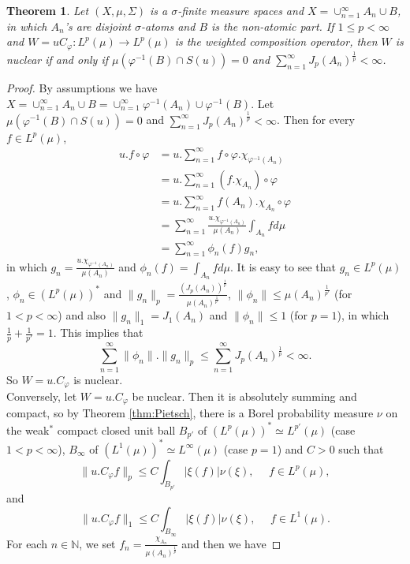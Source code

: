 \documentclass{amsart}
\newtheorem{thm}{Theorem}[section]
\theoremstyle{definition}\newtheorem{defn}[thm]{Definition}
\theoremstyle{remark}
\numberwithin{equation}{section}
\begin{document}
\begin{thm}\label{n.pp}
Let $(X, \mu, \Sigma)$ is a $\sigma$-finite measure spaces and $X=\cup^{\infty}_{n=1}A_n\cup B$, in which $A_n$'s are disjoint $\sigma$-atoms and $B$ is the non-atomic part. If $1\leq p<\infty$  and $W=uC_{\varphi}:L^p(\mu)\rightarrow L^p(\mu)$ is the weighted composition operator, then $W$ is nuclear if and only if $\mu(\varphi^{-1}(B)\cap S(u))=0$ and $\sum^{\infty}_{n=1}J_p(A_n)^{\frac{1}{p}}<\infty$.
\end{thm}
\begin{proof}
By assumptions we have $X=\cup^{\infty}_{n=1}A_n\cup B=\cup^{\infty}_{n=1}\varphi^{-1}(A_n)\cup \varphi^{-1}(B)$. Let $\mu(\varphi^{-1}(B)\cap S(u))=0$ and $\sum^{\infty}_{n=1}J_p(A_n)^{\frac{1}{p}}<\infty$. Then for every $f\in L^p(\mu)$,
\begin{align*}
u.f\circ \varphi&=u.\sum^{\infty}_{n=1}f\circ\varphi.\chi_{\varphi^{-1}(A_n)}\\
&=u.\sum^{\infty}_{n=1}(f.\chi_{A_n})\circ\varphi\\
&=u.\sum^{\infty}_{n=1}f(A_n).\chi_{A_n}\circ\varphi\\
&=\sum^{\infty}_{n=1}\frac{u.\chi_{\varphi^{-1}(A_n)}}{\mu(A_n)}\int_{A_n}fd\mu\\
&=\sum^{\infty}_{n=1}\phi_n(f)g_n,
\end{align*}
in which $g_n=\frac{u.\chi_{\varphi^{-1}(A_n)}}{\mu(A_n)}$ and $\phi_n(f)=\int_{A_n}fd\mu$. It is easy to see that $g_n\in L^p(\mu)$, $\phi_n\in (L^p(\mu))^*$ and $\|g_n\|_p=\frac{(J_p(A_n))^{\frac{1}{p}}}{\mu(A_n)^{\frac{1}{p'}}}$, $\|\phi_n\|\leq\mu(A_n)^{\frac{1}{p'}}$ (for $1<p<\infty$) and also $\|g_n\|_1=J_1(A_n)$ and $\|\phi_n\|\leq1$ (for $p=1$), in which $\frac{1}{p}+\frac{1}{p'}=1$. This implies that 
$$\sum^{\infty}_{n=1}\|\phi_n\|.\|g_n\|_p\leq \sum^{\infty}_{n=1}J_p(A_n)^{\frac{1}{p}}<\infty.$$
So $W=u.C_{\varphi}$ is nuclear.\\
Conversely, let $W=u.C_{\varphi}$ be nuclear. Then it is absolutely summing and compact, so by Theorem \ref{thm:Pietsch}, there is a Borel probability measure $\nu$ on the weak$^*$ compact closed unit ball $B_{p'}$ of $(L^p(\mu))^*\simeq L^{p'}(\mu)$ (case $1<p<\infty$), $B_{\infty}$ of $(L^1(\mu))^*\simeq L^{\infty}(\mu)$ (case $p=1$) and $C>0$ such that
$$\|u.C_{\varphi}f\|_p\leq C \int_{B_{p'}}|\xi(f)|\nu(\xi), \ \ \ \ \ \ f\in L^p(\mu),$$
and 
$$\|u.C_{\varphi}f\|_1\leq C \int_{B_{\infty}}|\xi(f)|\nu(\xi), \ \ \ \ \ \ f\in L^1(\mu).$$
For each $n\in \mathbb{N}$, we set $f_n=\frac{\chi_{A_n}}{\mu(A_n)^{\frac{1}{p}}}$ and then we have

\end{proof}
\end{document}
